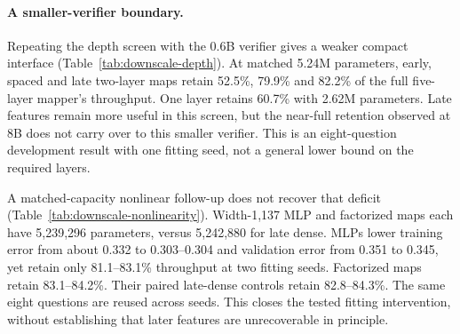 \documentclass{article}
\begin{document}
\paragraph{A smaller-verifier boundary.}
Repeating the depth screen with the 0.6B verifier gives a weaker compact
interface (Table~\ref{tab:downscale-depth}). At matched 5.24M parameters,
early, spaced and late two-layer maps retain 52.5\%, 79.9\% and 82.2\%
of the full five-layer mapper's throughput. One layer retains 60.7\%
with 2.62M parameters. Late features remain more useful in this screen,
but the near-full retention observed at 8B does not carry over to this
smaller verifier. This is an eight-question development result with
one fitting seed, not a general lower bound on the required layers.

\begin{table}[H]
\centering\small

\caption{Downward-retargeting depth screen, 4B-trained DFlash to a 0.6B
verifier. All fits use 512 records and 8,192 updates. Decoding uses eight
exposed GSM8K requests with a 512-token cap. Retention is relative to
each worker's paired full mapper. Errors use the common fitting and
validation sets.}
\label{tab:downscale-depth}
\end{table}


A matched-capacity nonlinear follow-up does not recover that deficit
(Table~\ref{tab:downscale-nonlinearity}). Width-1,137 MLP and factorized
maps each have 5,239,296 parameters, versus 5,242,880 for late dense.
MLPs lower training error from about 0.332 to 0.303--0.304 and validation
error from 0.351 to 0.345, yet retain only 81.1--83.1\% throughput at
two fitting seeds. Factorized maps retain 83.1--84.2\%. Their paired
late-dense controls retain 82.8--84.3\%. The same eight questions are
reused across seeds. This closes the tested fitting intervention,
without establishing that later features are unrecoverable in principle.

\begin{table}[H]
\centering\small

\caption{Matched-size nonlinear follow-up for 0.6B late-layer mapping.
Both architectures use layers [19,25], 512 records and 8,192 updates.
Retention is relative to each worker's full mapper on the same eight
exposed questions. Fitting seeds do not add independent evaluation
samples. Better feature regression does not close the decoding deficit.}
\label{tab:downscale-nonlinearity}
\end{table}
\end{document}

